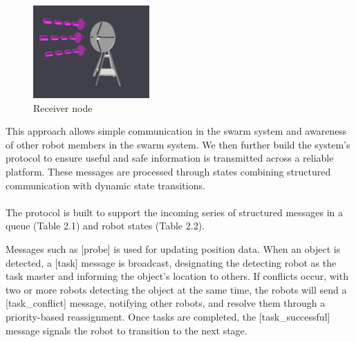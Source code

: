 \begin{figure}[!htb]
        \includegraphics[width=\linewidth]{assets/images/communication/devices/receiver.png}
        \caption{Receiver node}\label{fig:Receiver}
    \endminipage
\end{figure}

This approach allows simple communication in the swarm system and awareness of other robot members in the swarm system. We then further build the system's protocol to ensure useful and safe information is transmitted across a reliable platform. These messages are processed through states combining structured communication with dynamic state transitions. 

\paragraph*{}
The protocol is built to support the incoming series of structured messages in a queue (Table 2.1) and robot states (Table 2.2).

Messages such as [probe] is used for updating position data. When an object is detected, a [task] message is broadcast, designating the detecting robot as the task master and informing the object's location to others. If conflicts occur, with two or more robots detecting the object at the same time, the robots will send a [task\_conflict] message, notifying other robots, and resolve them through a priority-based reassignment. Once tasks are completed, the [task\_successful] message signals the robot to transition to the next stage.

